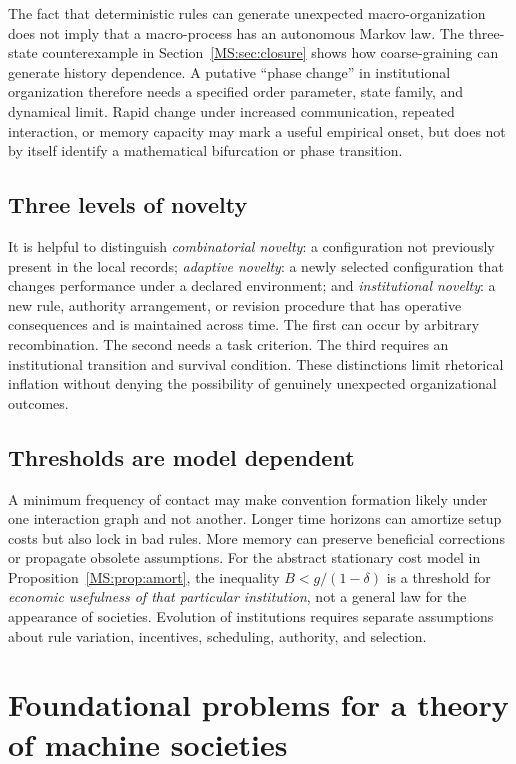 The fact that deterministic rules can generate unexpected macro-organization does not imply that a macro-process has an autonomous Markov law. The three-state counterexample in Section~\ref{MS:sec:closure} shows how coarse-graining can generate history dependence. A putative ``phase change'' in institutional organization therefore needs a specified order parameter, state family, and dynamical limit. Rapid change under increased communication, repeated interaction, or memory capacity may mark a useful empirical onset, but does not by itself identify a mathematical bifurcation or phase transition.

\subsection{Three levels of novelty}

It is helpful to distinguish \emph{combinatorial novelty}: a configuration not previously present in the local records; \emph{adaptive novelty}: a newly selected configuration that changes performance under a declared environment; and \emph{institutional novelty}: a new rule, authority arrangement, or revision procedure that has operative consequences and is maintained across time. The first can occur by arbitrary recombination. The second needs a task criterion. The third requires an institutional transition and survival condition. These distinctions limit rhetorical inflation without denying the possibility of genuinely unexpected organizational outcomes.

\subsection{Thresholds are model dependent}

A minimum frequency of contact may make convention formation likely under one interaction graph and not another. Longer time horizons can amortize setup costs but also lock in bad rules. More memory can preserve beneficial corrections or propagate obsolete assumptions. For the abstract stationary cost model in Proposition~\ref{MS:prop:amort}, the inequality $B<g/(1-\delta)$ is a threshold for \emph{economic usefulness of that particular institution}, not a general law for the appearance of societies. Evolution of institutions requires separate assumptions about rule variation, incentives, scheduling, authority, and selection.

\section{Foundational problems for a theory of machine societies}\label{MS:sec:problems}

